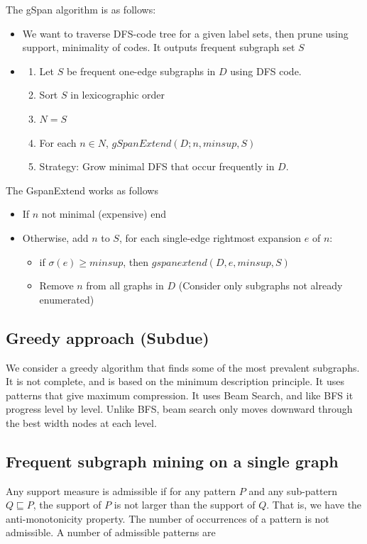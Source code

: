     The gSpan algorithm is as follows:
    \begin{itemize}
        \item We want to traverse DFS-code tree for a given label sets, then prune using support, minimality of codes. It outputs frequent subgraph set $S$
        \item \begin{enumerate}
            \item Let $S$ be frequent one-edge subgraphs in $D$ using DFS code.
            \item Sort $S$ in lexicographic order
            \item $N = S$
            \item For each $n \in N$, $gSpanExtend(D; n, minsup, S)$
            \item Strategy: Grow minimal DFS that occur frequently in $D$.
        \end{enumerate}
    \end{itemize}
    The GspanExtend works as follows
    \begin{itemize}
        \item If $n$ not minimal (expensive) end
        \item Otherwise, add $n$ to $S$, for each single-edge rightmost expansion $e$ of $n$: 
        \begin{itemize}
            \item if $\sigma(e) \geq minsup$, then $gspanextend(D, e, minsup, S)$
            \item Remove $n$ from all graphs in $D$ (Consider only subgraphs not already enumerated)
        \end{itemize}
    \end{itemize}
    
\subsection{Greedy approach (Subdue)}
    We consider a greedy algorithm that finds some of the most prevalent subgraphs. It is not complete, and is based on the minimum description principle. It uses patterns that give maximum compression. It uses Beam Search, and like BFS it progress level by level. Unlike BFS, beam search only moves downward through the best width nodes at each level.
    
\subsection{Frequent subgraph mining on a single graph}
    Any support measure is admissible if for any pattern $P$ and any sub-pattern $Q \sqsubseteq P$, the support of $P$ is not larger than the support of $Q$. That is, we have the anti-monotonicity property. The number of occurrences of a pattern is not admissible. A number of admissible patterns are 
    
